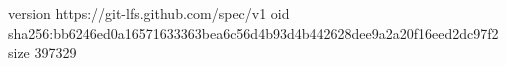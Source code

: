 version https://git-lfs.github.com/spec/v1
oid sha256:bb6246ed0a16571633363bea6c56d4b93d4b442628dee9a2a20f16eed2dc97f2
size 397329
